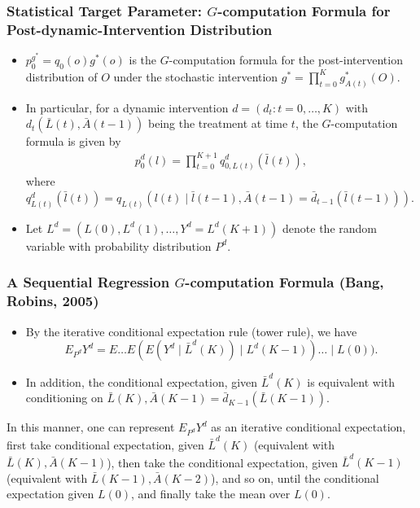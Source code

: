 \documentclass[t]{beamer}
\begin{document}
\begin{frame}
\frametitle{Statistical Target Parameter: $G$-computation Formula for Post-dynamic-Intervention Distribution}
\begin{itemize}
\item $p^{g^*}_0=q_0(o)g^*(o)$ is the $G$-computation formula for the post-intervention distribution of $O$ under the stochastic intervention $g^*=\prod_{t=0}^K g^*_{A(t)}(O)$.
\item
In particular, for a dynamic intervention $d=(d_t: t=0,\ldots,K)$ with $d_t(\bar{L}(t),\bar{A}(t-1))$ being the treatment at time $t$, the $G$-computation formula is given by \begin{align}
\label{eqn:Gcomp}
p^d_0(l)=\prod_{t=0}^{K+1}q_{0,L(t)}^d(\bar{l}(t)),
\end{align}
where $q_{L(t)}^d(\bar{l}(t))=q_{L(t)}(l(t)\mid \bar{l}(t-1),\bar{A}(t-1)=\bar{d}_{t-1}(\bar{l}(t-1)) )$. 
\item
Let $L^d=(L(0),L^d(1),\ldots,Y^d=L^d(K+1))$ denote the random variable with probability distribution $P^d$. 
\end{itemize}
\end{frame}

\begin{frame}
\frametitle{A Sequential Regression $G$-computation Formula (Bang, Robins, 2005)}
\begin{itemize}
\item
By the iterative conditional expectation rule (tower rule), we have\[E_{P^d}Y^d=E\ldots E(E(Y^d\mid \bar{L}^d(K))\mid L^d(K-1))\ldots \mid L(0)).\]
\item
In addition, the conditional expectation, given $\bar{L}^d(K)$ is equivalent with conditioning on 
$\bar{L}(K),\bar{A}(K-1)=\bar{d}_{K-1}(\bar{L}(K-1))$.
\end{itemize}
In this manner, one can represent $E_{P^d}Y^d$ as an iterative conditional expectation, first take conditional expectation, given $\bar{L}^d(K)$ (equivalent with $\bar{L}(K),\bar{A}(K-1)$), then take the conditional expectation, given $\bar{L}^d(K-1)$ (equivalent with $\bar{L}(K-1),\bar{A}(K-2)$),  and so on, until the conditional expectation given $L(0)$, and finally take the mean over $L(0)$.
\end{frame}
\end{document}
